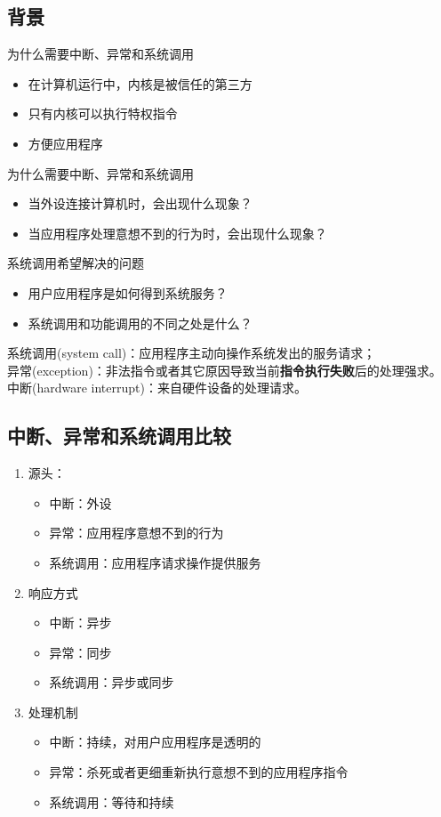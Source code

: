 \subsection{背景}
为什么需要中断、异常和系统调用
\begin{itemize}
	\item 在计算机运行中，内核是被信任的第三方
	\item 只有内核可以执行特权指令
	\item 方便应用程序
\end{itemize}
为什么需要中断、异常和系统调用
\begin{itemize}
	\item 当外设连接计算机时，会出现什么现象？
	\item 当应用程序处理意想不到的行为时，会出现什么现象？
\end{itemize}
系统调用希望解决的问题
\begin{itemize}
	\item 用户应用程序是如何得到系统服务？
	\item 系统调用和功能调用的不同之处是什么？
\end{itemize}
系统调用(system call)：应用程序主动向操作系统发出的服务请求；\\
异常(exception)：非法指令或者其它原因导致当前\textbf{指令执行失败}后的处理强求。\\
中断(hardware interrupt)：来自硬件设备的处理请求。\\
\subsection{中断、异常和系统调用比较}
\begin{enumerate}
	\item 源头：
	\begin{itemize}
		\item 中断：外设
		\item 异常：应用程序意想不到的行为
		\item 系统调用：应用程序请求操作提供服务
	\end{itemize}
	\item 响应方式
	\begin{itemize}
		\item 中断：异步
		\item 异常：同步
		\item 系统调用：异步或同步
	\end{itemize}
	\item 处理机制
	\begin{itemize}
		\item 中断：持续，对用户应用程序是透明的
		\item 异常：杀死或者更细重新执行意想不到的应用程序指令
		\item 系统调用：等待和持续
	\end{itemize}
\end{enumerate}

